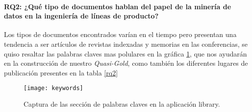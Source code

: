 \paragraph{RQ2: ¿Qué tipo de documentos hablan del papel de la minería de datos en la ingeniería de líneas de producto?}
 
Los tipos de documentos encontrados varían en el tiempo pero presentan una tendencia a ser artículos de revistas indexadas y memorias en las conferencias, se quiso resaltar las palabras claves mas polulares en la gráfica \ref{keywords}, que nos ayudarán en la construcción de nuestro \textit{Quasi-Gold}, como también los diferentes lugares de publicación presentes en la tabla \ref{rq2} 

\begin{figure}[h]
	\centering
	\texttt{[image: keywords]}
	\caption{Captura de las sección de palabras claves en la aplicación library.}
	\label{keywords}
\end{figure}


